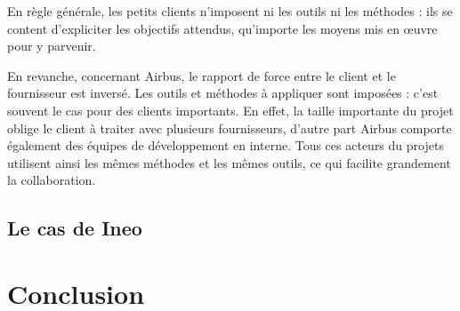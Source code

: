 En règle générale, les petits clients n'imposent ni les outils ni les méthodes : ils se content d'expliciter les objectifs attendus, qu'importe les moyens mis en œuvre pour y parvenir.

En revanche, concernant Airbus, le rapport de force entre le client et le fournisseur est inversé. Les outils et méthodes à appliquer sont imposées : c'est souvent le cas pour des clients importants. En effet, la taille importante du projet oblige le client à traiter avec plusieurs fournisseurs, d'autre part Airbus comporte également des équipes de développement en interne. Tous ces acteurs du projets utilisent ainsi les mêmes méthodes et les mêmes outils, ce qui facilite grandement la collaboration.

\subsection{Le cas de Ineo}



\section{Conclusion}
